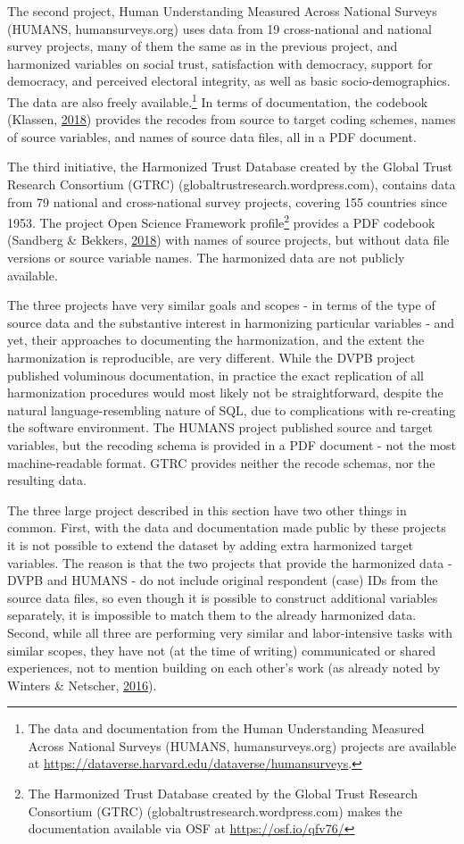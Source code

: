 \documentclass[12pt,]{article}
\let\rmarkdownfootnote\footnote%
\def\footnote{\protect\rmarkdownfootnote}
\begin{document}
The second project, Human Understanding Measured Across National Surveys (HUMANS, humansurveys.org) uses data from 19 cross-national and national survey projects, many of them the same as in the previous project, and harmonized variables on social trust, satisfaction with democracy, support for democracy, and perceived electoral integrity, as well as basic socio-demographics. The data are also freely available.\footnote{The data and documentation from the Human Understanding Measured Across National Surveys (HUMANS, humansurveys.org) projects are available at \url{https://dataverse.harvard.edu/dataverse/humansurveys}.} In terms of documentation, the codebook (Klassen, \protect\hyperlink{ref-Klassen2018}{2018}) provides the recodes from source to target coding schemes, names of source variables, and names of source data files, all in a PDF document.

The third initiative, the Harmonized Trust Database created by the Global Trust Research Consortium (GTRC) (globaltrustresearch.wordpress.com), contains data from 79 national and cross-national survey projects, covering 155 countries since 1953. The project Open Science Framework profile\footnote{The Harmonized Trust Database created by the Global Trust Research Consortium (GTRC) (globaltrustresearch.wordpress.com) makes the documentation available via OSF at \url{https://osf.io/qfv76/}} provides a PDF codebook (Sandberg \& Bekkers, \protect\hyperlink{ref-Sandberg2018}{2018}) with names of source projects, but without data file versions or source variable names. The harmonized data are not publicly available.

The three projects have very similar goals and scopes - in terms of the type of source data and the substantive interest in harmonizing particular variables - and yet, their approaches to documenting the harmonization, and the extent the harmonization is reproducible, are very different. While the DVPB project published voluminous documentation, in practice the exact replication of all harmonization procedures would most likely not be straightforward, despite the natural language-resembling nature of SQL, due to complications with re-creating the software environment. The HUMANS project published source and target variables, but the recoding schema is provided in a PDF document - not the most machine-readable format. GTRC provides neither the recode schemas, nor the resulting data.

The three large project described in this section have two other things in common. First, with the data and documentation made public by these projects it is not possible to extend the dataset by adding extra harmonized target variables. The reason is that the two projects that provide the harmonized data - DVPB and HUMANS - do not include original respondent (case) IDs from the source data files, so even though it is possible to construct additional variables separately, it is impossible to match them to the already harmonized data. Second, while all three are performing very similar and labor-intensive tasks with similar scopes, they have not (at the time of writing) communicated or shared experiences, not to mention building on each other's work (as already noted by Winters \& Netscher, \protect\hyperlink{ref-Winters2016}{2016}).
\end{document}
